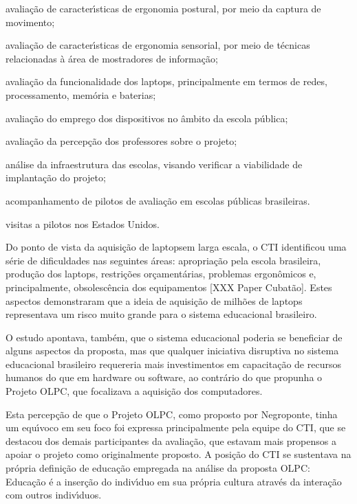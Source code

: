 \documentclass[
12pt,		%
openright,	%
twoside,  %
a4paper,			%
chapter=TITLE,		%
english,			%
french,				%
spanish,			%
brazil				%
]{USPSC-classe/USPSC}
\begin{document}
\begin{alineas}
\item avalia\c{c}\~ao de caracter\'{\i}sticas de ergonomia postural, por meio da captura de movimento;
\item avalia\c{c}\~ao de caracter\'{\i}sticas de ergonomia sensorial, por meio de t\'ecnicas relacionadas \`a \'area de mostradores de informa\c{c}\~ao;
\item avalia\c{c}\~ao da funcionalidade dos \textquotedbl laptops, principalmente em termos de redes, processamento, mem\'oria e baterias;
\item avalia\c{c}\~ao do emprego dos dispositivos no \^ambito da escola p\'ublica;
\item avalia\c{c}\~ao da percep\c{c}\~ao dos professores sobre o projeto;
\item an\'alise da infraestrutura das escolas, visando verificar a viabilidade de implanta\c{c}\~ao do projeto;
\item acompanhamento de pilotos de avalia\c{c}\~ao em escolas p\'ublicas brasileiras.
\item visitas a pilotos nos Estados Unidos.
\end{alineas}

Do ponto de vista da aquisi\c{c}\~ao de \textquotedbl laptops\textquotedbl  em larga escala, o CTI identificou uma s\'erie de dificuldades nas seguintes \'areas: apropria\c{c}\~ao pela escola brasileira, produ\c{c}\~ao dos laptops, restri\c{c}\~oes or\c{c}ament\'arias, problemas ergon\^omicos e, principalmente, obsolesc\^encia dos equipamentos [XXX Paper Cubat\~ao]. Estes aspectos demonstraram que a ideia de aquisi\c{c}\~ao de milh\~oes de laptops representava um risco muito grande para o sistema educacional brasileiro.


O estudo apontava, tamb\'em, que o sistema educacional poderia se beneficiar de alguns aspectos da proposta, mas que qualquer iniciativa disruptiva no sistema educacional brasileiro requereria mais investimentos em capacita\c{c}\~ao de recursos humanos do que em hardware ou software, ao contr\'ario do que propunha o Projeto OLPC, que focalizava a aquisi\c{c}\~ao dos computadores.


Esta percep\c{c}\~ao de que o Projeto OLPC, como proposto por Negroponte, tinha um equ\'{\i}voco em seu foco foi expressa principalmente pela equipe do CTI, que se destacou dos demais participantes da avalia\c{c}\~ao, que estavam mais propensos a apoiar o projeto como originalmente proposto. A posi\c{c}\~ao do CTI se sustentava na pr\'opria defini\c{c}\~ao de educa\c{c}\~ao empregada na an\'alise da proposta OLPC: \textquotedbl Educa\c{c}\~ao \'e a inser\c{c}\~ao do indiv\'{\i}duo em sua pr\'opria cultura atrav\'es da intera\c{c}\~ao com outros indiv\'{\i}duos.
\end{document}
